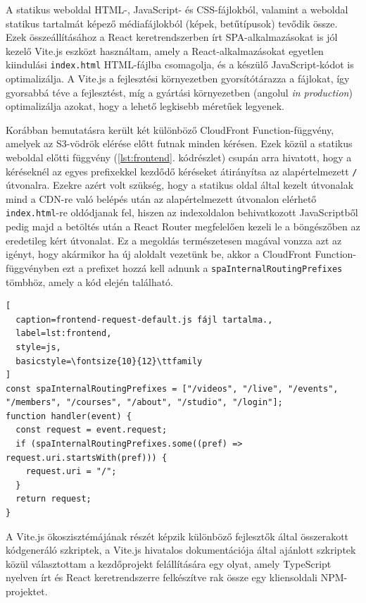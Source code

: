 A statikus weboldal HTML-, JavaScript- és CSS-fájlokból, valamint a weboldal statikus tartalmát képező médiafájlokból (képek, betűtípusok) tevődik össze. Ezek összeállításához a React keretrendszerben írt SPA-alkalmazásokat is jól kezelő Vite.js eszközt használtam, amely a React-alkalmazásokat egyetlen kiindulási \verb|index.html| HTML-fájlba csomagolja, és a készülő JavaScript-kódot is optimalizálja. A Vite.js a fejlesztési környezetben gyorsítótárazza a fájlokat, így gyorsabbá téve a fejlesztést, míg a gyártási környezetben (angolul \emph{in production}) optimalizálja azokat, hogy a lehető legkisebb méretűek legyenek.

Korábban bemutatásra került két különböző CloudFront Function-függvény, amelyek az S3-vödrök elérése előtt futnak minden kérésen. Ezek közül a statikus weboldal előtti függvény (\ref{lst:frontend}. kódrészlet) csupán arra hivatott, hogy a kéréseknél az egyes prefixekkel kezdődő kéréseket átirányítsa az alapértelmezett \verb|/| útvonalra. Ezekre azért volt szükség, hogy a statikus oldal által kezelt útvonalak mind a CDN-re való belépés után az alapértelmezett útvonalon elérhető \verb|index.html|-re oldódjanak fel, hiszen az indexoldalon behivatkozott JavaScriptből pedig majd a betöltés után a React Router megfelelően kezeli le a böngészőben az eredetileg kért útvonalat. Ez a megoldás természetesen magával vonzza azt az igényt, hogy akármikor ha új aloldalt vezetünk be, akkor a CloudFront Function-függvényben ezt a prefixet hozzá kell adnunk a \verb|spaInternalRoutingPrefixes| tömbhöz, amely a kód elején található.

\begin{minipage}{0.92\textwidth}
  \begin{lstlisting}[
  caption=frontend-request-default.js fájl tartalma.,
  label=lst:frontend,
  style=js,
  basicstyle=\fontsize{10}{12}\ttfamily
]
const spaInternalRoutingPrefixes = ["/videos", "/live", "/events", "/members", "/courses", "/about", "/studio", "/login"];
function handler(event) {
  const request = event.request;
  if (spaInternalRoutingPrefixes.some((pref) => request.uri.startsWith(pref))) {
    request.uri = "/";
  }
  return request;
}
\end{lstlisting}
\end{minipage}

A Vite.js ökoszisztémájának részét képzik különböző fejlesztők által összerakott kódgeneráló szkriptek, a Vite.js hivatalos dokumentációja által ajánlott szkriptek közül választottam a kezdőprojekt felállítására egy olyat, amely TypeScript nyelven írt és React keretrendszerre felkészítve rak össze egy kliensoldali NPM-projektet.

